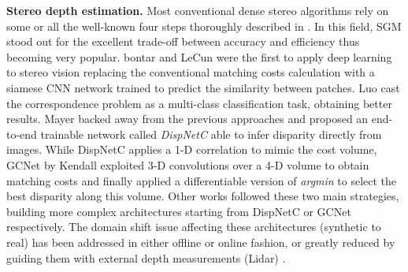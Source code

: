 \documentclass[10pt,twocolumn,letterpaper]{article}
\begin{document}
\textbf{Stereo depth estimation.}
Most conventional dense stereo algorithms rely on some or all the well-known four steps thoroughly described in \cite{scharstein2002taxonomy}. In this field, SGM \cite{hirschmuller2005accurate} stood out for the excellent trade-off between accuracy and efficiency thus becoming very popular.   
bontar and LeCun \cite{zbontar2016stereo} were the first to apply deep learning to stereo vision replacing the conventional matching costs calculation with a siamese CNN network trained to predict the similarity between patches. Luo \etal \cite{luo2016efficient} cast the correspondence problem as a multi-class classification task, obtaining better results. Mayer \etal \cite{Mayer_2016_CVPR} backed away from the previous approaches and proposed an end-to-end trainable network called \textit{DispNetC} able to infer disparity directly from images. While DispNetC applies a 1-D correlation to mimic the cost volume, GCNet by Kendall \etal \cite{Kendall_2017_ICCV} exploited 3-D convolutions over a 4-D volume to obtain matching costs and finally applied a differentiable version of \textit{argmin} to select the best disparity along this volume. Other works followed these two main strategies, building more complex architectures starting from DispNetC \cite{Pang_2017_ICCV_Workshops,Liang_2018_CVPR,yang2018segstereo,song2018stereo} or GCNet \cite{Chang_2018_CVPR,yu2018kandao,khamis2018stereonet} respectively. The domain shift issue affecting these architectures (\eg synthetic to real) has been addressed in either offline \cite{Tonioni_2017_ICCV} or online \cite{Tonioni_2019_CVPR} fashion, or greatly reduced by guiding them with external depth measurements (\eg Lidar) \cite{POGGI_2019_CVPR}.
\end{document}
